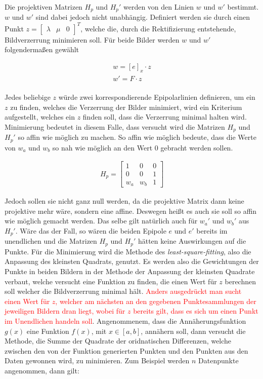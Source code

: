 Die projektiven Matrizen $H_p$ und $H_p'$ werden von den Linien $w$ und $w'$ bestimmt. $w$ und $w'$ sind dabei jedoch nicht unabhängig. Definiert werden sie durch einen Punkt $z = \begin{bmatrix}
\lambda&\mu&0\end{bmatrix}^T$, welche die, durch die Rektifizierung entstehende, Bildverzerrung minimieren soll. Für beide Bilder werden $w$ und $w'$ folgendermaßen gewählt

\begin{gather}
	w = [e]_x \cdot z\\
	w'= F\cdot z
\end{gather}\\

Jedes beliebige $z$ würde zwei korrespondierende Epipolarlinien definieren, um ein $z$ zu finden, welches die Verzerrung der Bilder minimiert, wird ein Kriterium aufgestellt, welches ein $z$ finden soll, dass die Verzerrung minimal halten wird. Minimierung bedeutet in diesem Falle, dass versucht wird die Matrizen $H_p$ und $H_p'$ so affin wie möglich zu machen. So affin wie möglich bedeute, dass die Werte von $w_a$ und $w_b$ so nah wie möglich an den Wert 0 gebracht werden sollen.

\begin{gather}
	H_p = 	\begin{bmatrix}
	1&0&0\\
	0&0&1\\
	w_a&w_b&1
	\end{bmatrix}
\end{gather}

Jedoch sollen sie nicht ganz null werden, da die projektive Matrix dann keine projektive mehr wäre, sondern eine affine.  Deswegen heißt es auch sie soll so affin wie möglich gemacht werden. Das selbe gilt natürlich auch für $w_a'$ und $w_b'$ aus $H_p'$. Wäre das der Fall, so wären die beiden Epipole $e$ und $e'$ bereits im unendlichen und die Matrizen $H_p$ und $H_p'$ hätten keine Auswirkungen auf die Punkte. Für die Minimierung wird die Methode des \textit{least-square-fitting}, also die Anpassung des kleinsten Quadrats, genutzt\cite{leastSquare}. Es werden also die Gewichtungen der Punkte in beiden Bildern in der Methode der Anpassung der kleinsten Quadrate verbaut, welche versucht eine Funktion zu finden, die einen Wert für $z$ berechnen soll welcher die Bildverzerrung minimal hält. \textcolor{red}{Anders ausgedrückt man sucht einen Wert für $z$, welcher am nächsten an den gegebenen Punktesammlungen der jeweiligen Bildern dran liegt, wobei für $z$ bereits gilt, dass es sich um einen Punkt im Unendlichen handeln soll}\cite{ZZ,leastSquare}. Angenommenem, dass die Annäherungsfunktion $g(x)$ eine Funktion $f(x)$, mit $x \in [a,b]$, annähern soll, dann versucht die Methode, die Summe der Quadrate der oridnatischen Differenzen, welche zwischen den von der Funktion generierten Punkten und den Punkten aus den Daten gewonnen wird, zu minimieren\cite{leastSquare,Margulies.}. Zum Beispiel werden $n$ Datenpunkte angenommen, dann gilt:

